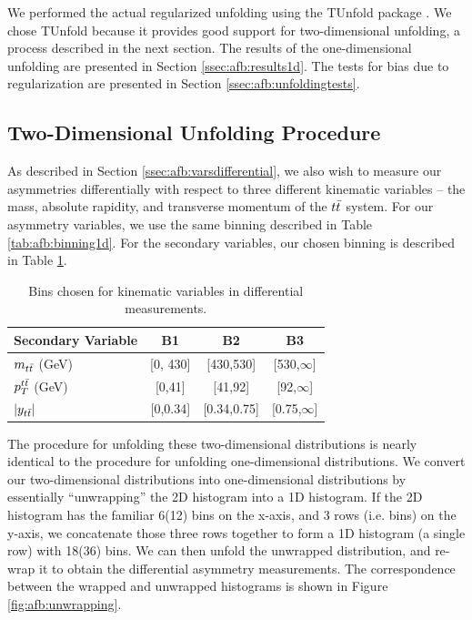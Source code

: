 We performed the actual regularized unfolding using the TUnfold
package \cite{tunfold}. We chose TUnfold because it provides good
support for two-dimensional unfolding, a process described in the next
section. The results of the one-dimensional unfolding are presented in
Section \ref{ssec:afb:results1d}. The tests for bias due to
regularization are presented in Section \ref{ssec:afb:unfoldingtests}.

\subsection{Two-Dimensional Unfolding Procedure}
\label{ssec:afb:unfolding2d}

As described in Section \ref{ssec:afb:varsdifferential}, we also wish
to measure our asymmetries differentially with respect to three
different kinematic variables -- the mass, absolute rapidity, and transverse
momentum of the $t\bar{t}$ system. For our asymmetry variables, we use
the same binning described in Table \ref{tab:afb:binning1d}. For the
secondary variables, our chosen binning is described in Table
\ref{tab:afb:binning2d}.

\begin{table}[htb]
\begin{center}
\caption{Bins chosen for kinematic variables in differential measurements.}
\label{tab:afb:binning2d}
\begin{tabular}{l |  c  c  c }
\hline
Secondary Variable &  B1  &  B2 &  B3 \\ \hline
$m_{t\bar{t}}$ (GeV)    &  [0, 430]  &  [430,530]  &  [530,$\infty$]  \\ \hline
$p_{T}^{t\bar{t}}$ (GeV)    &  [0,41]  &  [41,92]  &  [92,$\infty$] \\ \hline
$|y_{t\bar{t}}|$        &  [0,0.34]  &  [0.34,0.75]  &  [0.75,$\infty$] \\ \hline
 \hline
\end{tabular}
\end{center}
\end{table}

The procedure for unfolding these two-dimensional distributions is
nearly identical to the procedure for unfolding
one-dimensional distributions. We convert our two-dimensional
distributions into one-dimensional distributions by essentially
``unwrapping'' the 2D histogram into a 1D histogram. If the 2D
histogram has the familiar 6(12) bins on the x-axis, and 3 rows (i.e. bins) on the
y-axis, we concatenate those three rows together to form a 1D histogram
(a single row) with 18(36) bins. We can then unfold the unwrapped
distribution, and re-wrap it to obtain the differential asymmetry
measurements. The correspondence between the wrapped and unwrapped
histograms is shown in Figure \ref{fig:afb:unwrapping}.

